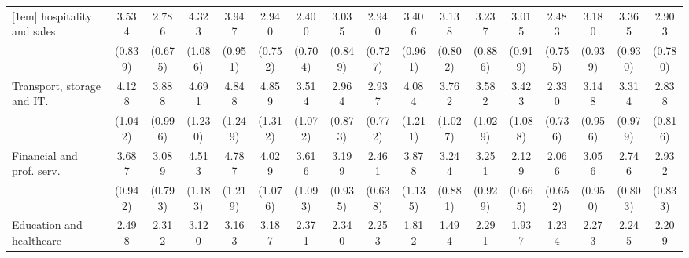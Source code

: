 {\begin{tabular}{l*{16}{c}}
[1em]
hospitality and sales&       3.534\sym{***}&       2.786\sym{***}&       4.323\sym{***}&       3.947\sym{***}&       2.940\sym{***}&       2.400\sym{**} &       3.035\sym{***}&       2.940\sym{***}&       3.406\sym{***}&       3.138\sym{***}&       3.237\sym{***}&       3.015\sym{***}&       2.483\sym{**} &       3.180\sym{***}&       3.365\sym{***}&       2.903\sym{***}\\
                    &     (0.839)         &     (0.675)         &     (1.086)         &     (0.951)         &     (0.752)         &     (0.704)         &     (0.849)         &     (0.727)         &     (0.961)         &     (0.802)         &     (0.886)         &     (0.919)         &     (0.755)         &     (0.939)         &     (0.930)         &     (0.780)         \\
[1em]
Transport, storage and IT.&       4.128\sym{***}&       3.888\sym{***}&       4.691\sym{***}&       4.848\sym{***}&       4.859\sym{***}&       3.514\sym{***}&       2.964\sym{***}&       2.937\sym{***}&       4.084\sym{***}&       3.762\sym{***}&       3.582\sym{***}&       3.423\sym{***}&       2.330\sym{**} &       3.148\sym{***}&       3.314\sym{***}&       2.838\sym{***}\\
                    &     (1.042)         &     (0.996)         &     (1.230)         &     (1.249)         &     (1.312)         &     (1.072)         &     (0.873)         &     (0.772)         &     (1.211)         &     (1.027)         &     (1.029)         &     (1.088)         &     (0.736)         &     (0.956)         &     (0.979)         &     (0.816)         \\
[1em]
Financial and prof. serv.&       3.687\sym{***}&       3.089\sym{***}&       4.513\sym{***}&       4.787\sym{***}&       4.029\sym{***}&       3.616\sym{***}&       3.199\sym{***}&       2.461\sym{***}&       3.878\sym{***}&       3.244\sym{***}&       3.251\sym{***}&       2.129\sym{*}  &       2.066\sym{*}  &       3.056\sym{***}&       2.746\sym{***}&       2.932\sym{***}\\
                    &     (0.942)         &     (0.793)         &     (1.183)         &     (1.219)         &     (1.076)         &     (1.093)         &     (0.935)         &     (0.638)         &     (1.135)         &     (0.881)         &     (0.929)         &     (0.665)         &     (0.652)         &     (0.950)         &     (0.803)         &     (0.833)         \\
[1em]
Education and healthcare&       2.498\sym{***}&       2.312\sym{**} &       3.120\sym{***}&       3.163\sym{***}&       3.187\sym{***}&       2.371\sym{**} &       2.340\sym{**} &       2.253\sym{**} &       1.812         &       1.494         &       2.291\sym{*}  &       1.937         &       1.234         &       2.273\sym{*}  &       2.245\sym{*}  &       2.209\sym{*}  \\

\end{tabular}}

